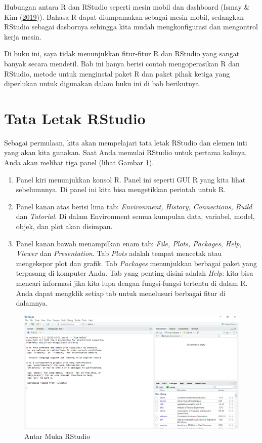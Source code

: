 \documentclass[a4paper, nobind]{templates/ociamthesis}
\providecommand{\tightlist}{%
  \setlength{\itemsep}{0pt}\setlength{\parskip}{0pt}}
\begin{document}
Hubungan antara R dan RStudio seperti mesin mobil dan dashboard (Ismay \& Kim (\protect\hyperlink{ref-ismayStatisticalInferenceData2019}{2019})). Bahasa R dapat diumpamakan sebagai mesin mobil, sedangkan RStudio sebagai dasbornya sehingga kita mudah mengkonfigurasi dan mengontrol kerja mesin.

Di buku ini, saya tidak menunjukkan fitur-fitur R dan RStudio yang sangat banyak secara mendetil. Bab ini hanya berisi contoh mengoperasikan R dan RStudio, metode untuk menginstal paket R dan paket pihak ketiga yang diperlukan untuk digunakan dalam buku ini di bab berikutnya.

\hypertarget{tata-letak-rstudio}{%
\section{Tata Letak RStudio}\label{tata-letak-rstudio}}

Sebagai permulaan, kita akan mempelajari tata letak RStudio dan elemen inti yang akan kita gunakan. Saat Anda memulai RStudio untuk pertama kalinya, Anda akan melihat tiga panel (lihat Gambar \ref{fig:3qu}).

\begin{enumerate}
\def\labelenumi{\arabic{enumi}.}
\tightlist
\item
  Panel kiri menunjukkan konsol R. Panel ini seperti GUI R yang kita lihat sebelumnnya. Di panel ini kita bisa mengetikkan perintah untuk R.
\item
  Panel kanan atas berisi lima tab: \emph{Environment, History, Connections, Build} dan \emph{Tutorial}. Di dalam Environment semua kumpulan data, variabel, model, objek, dan plot akan disimpan.
\item
  Panel kanan bawah menampilkan enam tab: \emph{File, Plots, Packages, Help, Viewer} dan \emph{Presentation}. Tab \emph{Plots} adalah tempat mencetak atau mengekspor plot dan grafik. Tab \emph{Packages} menunjukkan berbagai paket yang terpasang di komputer Anda. Tab yang penting disini adalah \emph{Help}: kita bisa mencari informasi jika kita lupa dengan fungsi-fungsi tertentu di dalam R. Anda dapat mengklik setiap tab untuk menelusuri berbagai fitur di dalamnya.
\end{enumerate}

\begin{figure}[H]
\includegraphics[width=1\linewidth]{figures/3qu} \caption{Antar Muka RStudio}\label{fig:3qu}
\end{figure}
\end{document}

